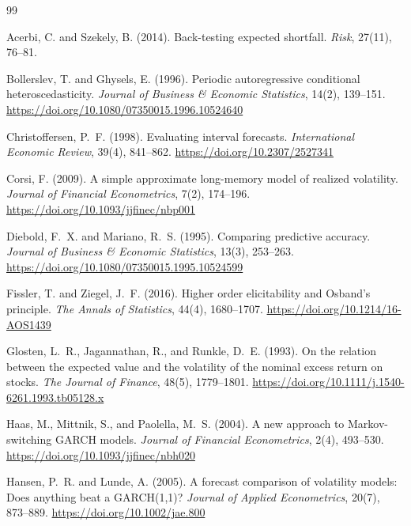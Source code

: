 \documentclass[11pt,a4paper]{article}
\begin{document}
\begin{thebibliography}{99}

Acerbi, C. and Szekely, B. (2014).
\newblock Back-testing expected shortfall.
\newblock \emph{Risk}, 27(11), 76--81.

Bollerslev, T. and Ghysels, E. (1996).
\newblock Periodic autoregressive conditional heteroscedasticity.
\newblock \emph{Journal of Business \& Economic Statistics}, 14(2), 139--151.
\newblock \url{https://doi.org/10.1080/07350015.1996.10524640}

Christoffersen, P.~F. (1998).
\newblock Evaluating interval forecasts.
\newblock \emph{International Economic Review}, 39(4), 841--862.
\newblock \url{https://doi.org/10.2307/2527341}

Corsi, F. (2009).
\newblock A simple approximate long-memory model of realized volatility.
\newblock \emph{Journal of Financial Econometrics}, 7(2), 174--196.
\newblock \url{https://doi.org/10.1093/jjfinec/nbp001}

Diebold, F.~X. and Mariano, R.~S. (1995).
\newblock Comparing predictive accuracy.
\newblock \emph{Journal of Business \& Economic Statistics}, 13(3), 253--263.
\newblock \url{https://doi.org/10.1080/07350015.1995.10524599}

Fissler, T. and Ziegel, J.~F. (2016).
\newblock Higher order elicitability and Osband's principle.
\newblock \emph{The Annals of Statistics}, 44(4), 1680--1707.
\newblock \url{https://doi.org/10.1214/16-AOS1439}

Glosten, L.~R., Jagannathan, R., and Runkle, D.~E. (1993).
\newblock On the relation between the expected value and the volatility of the nominal excess return on stocks.
\newblock \emph{The Journal of Finance}, 48(5), 1779--1801.
\newblock \url{https://doi.org/10.1111/j.1540-6261.1993.tb05128.x}

Haas, M., Mittnik, S., and Paolella, M.~S. (2004).
\newblock A new approach to Markov-switching GARCH models.
\newblock \emph{Journal of Financial Econometrics}, 2(4), 493--530.
\newblock \url{https://doi.org/10.1093/jjfinec/nbh020}

Hansen, P.~R. and Lunde, A. (2005).
\newblock A forecast comparison of volatility models: Does anything beat a GARCH(1,1)?
\newblock \emph{Journal of Applied Econometrics}, 20(7), 873--889.
\newblock \url{https://doi.org/10.1002/jae.800}


\end{thebibliography}
\end{document}
